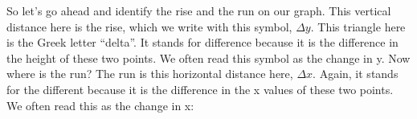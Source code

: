 \documentclass[pdftex, brazil, 12pt, twoside]{article}
\begin{document}
\begin{figure}[H]
  \begin{center}
  \end{center}
\end{figure}

So let's go ahead and identify the rise and the run
on our graph.
This vertical distance here is the rise,
which we write with this symbol, $\Delta y$.
This triangle here is the Greek letter ``delta''.
It stands for difference because it
is the difference in the height of these two points.
We often read this symbol as the change in y.
Now where is the run?
The run is this horizontal distance here, $\Delta x$.
Again, it stands for the different
because it is the difference in the x values of these two
points.
We often read this as the change in x:

\begin{figure}[H]
  \begin{center}
  \end{center}
\end{figure}
\end{document}
